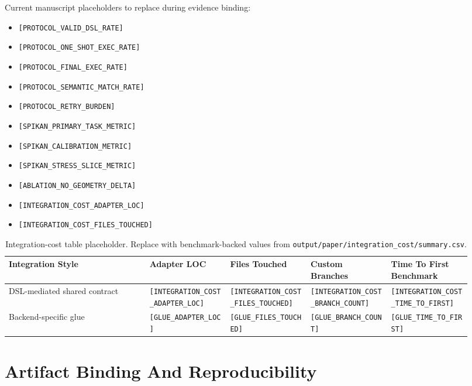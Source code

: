 \documentclass[11pt]{article}
\begin{document}
Current manuscript placeholders to replace during evidence binding:
\begin{itemize}[leftmargin=*]
  \item \texttt{[PROTOCOL\_VALID\_DSL\_RATE]}
  \item \texttt{[PROTOCOL\_ONE\_SHOT\_EXEC\_RATE]}
  \item \texttt{[PROTOCOL\_FINAL\_EXEC\_RATE]}
  \item \texttt{[PROTOCOL\_SEMANTIC\_MATCH\_RATE]}
  \item \texttt{[PROTOCOL\_RETRY\_BURDEN]}
  \item \texttt{[SPIKAN\_PRIMARY\_TASK\_METRIC]}
  \item \texttt{[SPIKAN\_CALIBRATION\_METRIC]}
  \item \texttt{[SPIKAN\_STRESS\_SLICE\_METRIC]}
  \item \texttt{[ABLATION\_NO\_GEOMETRY\_DELTA]}
  \item \texttt{[INTEGRATION\_COST\_ADAPTER\_LOC]}
  \item \texttt{[INTEGRATION\_COST\_FILES\_TOUCHED]}
\end{itemize}

\begin{table}[H]
  \centering
  \caption{Integration-cost table placeholder. Replace with benchmark-backed
  values from \texttt{output/paper/integration\_cost/summary.csv}.}
  \label{tab:integration-cost}
  \begin{tabular}{p{0.28\linewidth} p{0.16\linewidth} p{0.16\linewidth} p{0.16\linewidth} p{0.16\linewidth}}
    \toprule
    Integration Style & Adapter LOC & Files Touched & Custom Branches & Time To First Benchmark \\
    \midrule
    DSL-mediated shared contract & \texttt{[INTEGRATION\_COST\_ADAPTER\_LOC]} & \texttt{[INTEGRATION\_COST\_FILES\_TOUCHED]} & \texttt{[INTEGRATION\_COST\_BRANCH\_COUNT]} & \texttt{[INTEGRATION\_COST\_TIME\_TO\_FIRST]} \\
    Backend-specific glue & \texttt{[GLUE\_ADAPTER\_LOC]} & \texttt{[GLUE\_FILES\_TOUCHED]} & \texttt{[GLUE\_BRANCH\_COUNT]} & \texttt{[GLUE\_TIME\_TO\_FIRST]} \\
    \bottomrule
  \end{tabular}
\end{table}

\section{Artifact Binding And Reproducibility}
\end{document}
